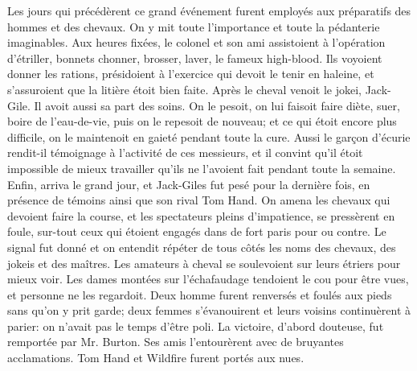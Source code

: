 Les jours qui précédèrent ce grand événement furent employés aux préparatifs des hommes et des chevaux. On y mit toute l'importance et toute la pédanterie imaginables. Aux heures fixées, le colonel et son ami assistoient à l'opération d'étriller, bonnets\setcounter{page}{521} chonner, brosser, laver, le fameux high-blood. Ils voyoient donner les rations, présidoient à l'exercice qui devoit le tenir en haleine, et s'assuroient que la litière étoit bien faite.
Après le cheval venoit le jokei, Jack-Gile. Il avoit aussi sa part des soins. On le pesoit, on lui faisoit faire diète, suer, boire de l'eau-de-vie, puis on le repesoit de nouveau; et ce qui étoit encore plus difficile, on le maintenoit en gaieté pendant toute la cure. Aussi le garçon d'écurie rendit-il témoignage à l'activité de ces messieurs, et il convint qu'il étoit impossible de mieux travailler qu'ils ne l'avoient fait pendant toute la semaine.
Enfin, arriva le grand jour, et Jack-Giles fut pesé pour la dernière fois, en présence de témoins ainsi que son rival Tom Hand. On amena les chevaux qui devoient faire la course, et les spectateurs pleins d'impatience, se pressèrent en foule, sur-tout ceux qui étoient engagés dans de fort paris pour ou contre. Le signal fut donné et on entendit répéter de tous côtés les noms des chevaux, des jokeis et des maîtres. Les amateurs à cheval se soulevoient sur leurs étriers pour mieux voir. Les dames montées sur l'échafaudage tendoient le cou pour être vues, et personne ne les regardoit. Deux homme\setcounter{page}{522} furent renversés et foulés aux pieds sans qu'on y prit garde; deux femmes s'évanouirent et leurs voisins continuèrent à parier: on n'avait pas le temps d'être poli. La victoire, d'abord douteuse, fut remportée par Mr. Burton. Ses amis l'entourèrent avec de bruyantes acclamations. Tom Hand et Wildfire furent portés aux nues.
